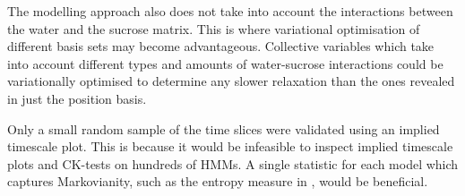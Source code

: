 The modelling approach also does not take into account the interactions between the water and the sucrose matrix. This is where variational optimisation of different basis sets may become advantageous. Collective variables which take into account different types and amounts of water-sucrose interactions could be variationally optimised to determine any slower  relaxation than the ones revealed in just the position basis.

Only a small random sample of the time slices were validated using an implied timescale plot. This is because it would be infeasible to inspect implied timescale plots and CK-tests on hundreds of HMMs. A single statistic for each model  which captures Markovianity, such as the entropy measure in \cite{parkValidationMarkovState2006}, would be beneficial. 




